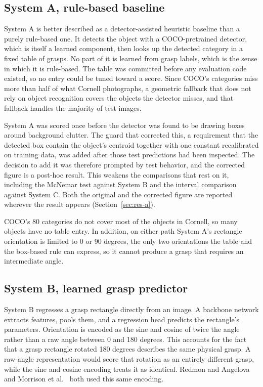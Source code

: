 \documentclass[12pt,letterpaper]{article}
\begin{document}
\subsection{System A, rule-based baseline}

System A is better described as a detector-assisted heuristic baseline
than a purely rule-based one. It detects the object with a
COCO-pretrained detector, which is itself a learned component, then
looks up the detected category in a fixed table of grasps. No part of it
is learned from grasp labels, which is the sense in which it is
rule-based. The table was committed before any evaluation code existed,
so no entry could be tuned toward a score. Since COCO's categories miss
more than half of what Cornell photographs, a geometric fallback that
does not rely on object recognition covers the objects the detector
misses, and that fallback handles the majority of test images.

System A was scored once before the detector was found to be drawing
boxes around background clutter. The guard that corrected this, a
requirement that the detected box contain the object's centroid together
with one constant recalibrated on training data, was added after those
test predictions had been inspected. The decision to add it was
therefore prompted by test behavior, and the corrected figure is a
post-hoc result. This weakens the comparisons that rest on it, including
the McNemar test against System B and the interval comparison against
System C. Both the original and the corrected figure are reported
wherever the result appears (Section~\ref{sec:res-a}).

COCO's 80 categories do not cover most of the objects in Cornell, so
many objects have no table entry. In addition, on either path System A's
rectangle orientation is limited to 0 or 90 degrees, the only two
orientations the table and the box-based rule can express, so it cannot
produce a grasp that requires an intermediate angle.

\subsection{System B, learned grasp predictor}

System B regresses a grasp rectangle directly from an image. A backbone
network extracts features, pools them, and a regression head predicts
the rectangle's parameters. Orientation is encoded as the sine and
cosine of twice the angle rather than a raw angle between 0 and 180
degrees. This accounts for the fact that a grasp rectangle rotated 180
degrees describes the same physical grasp. A raw-angle representation
would score that rotation as an entirely different grasp, while the sine
and cosine encoding treats it as identical. Redmon and
Angelova~\cite{redmon2015} and Morrison et al.~\cite{morrison2018} both
used this same encoding.
\end{document}
